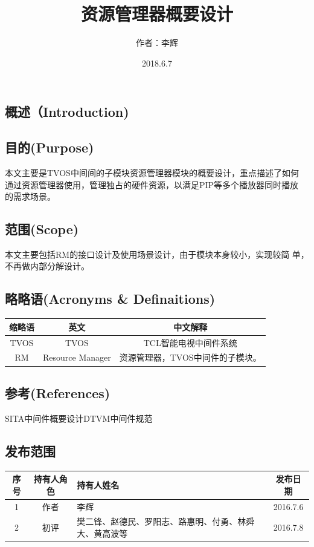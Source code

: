 \documentclass[10pt,a4paper,titlepage]{article} %
\title{资源管理器概要设计}
\author{作者：李辉}
\date{2018.6.7}
\begin{document}
	\maketitle
	\newpage

	\begin{flushleft}
	\section{概述（Introduction)}
		\subsection{目的(Purpose)}
		本文主要是TVOS中间间的子模块资源管理器模块的概要设计，重点描述了如何
		通过资源管理器使用，管理独占的硬件资源，以满足PIP等多个播放器同时播放
		的需求场景。
		\subsection{范围(Scope)}
		本文主要包括RM的接口设计及使用场景设计，由于模块本身较小，实现较简
		单，不再做内部分解设计。
		\subsection{略略语(Acronyms \& Definaitions)}
		\begin{tabular}{|c|c|c|}
		\hline
		缩略语&英文&中文解释\\
		\hline
		TVOS&TVOS&TCL智能电视中间件系统\\
		\hline
		RM&Resource Manager&资源管理器，TVOS中间件的子模块。\\
		\hline
		\end{tabular}

		\subsection{参考(References)}
		SITA中间件概要设计DTVM中间件规范
		\subsection{发布范围}
		\begin{center}
		\begin{tabular}{|c|c|p{100pt}|c|}
		\hline
		序号&持有人角色&持有人姓名&发布日期\\
		\hline
		1&作者&李辉&2016.7.6\\
		\hline
		2&初评&樊二锋、赵德民、罗阳志、路惠明、付勇、林舜大、黄高波等&2016.7.8\\
		\hline
		\end{tabular}
		\end{center}
		\newpage

\end{flushleft}
\end{document}
